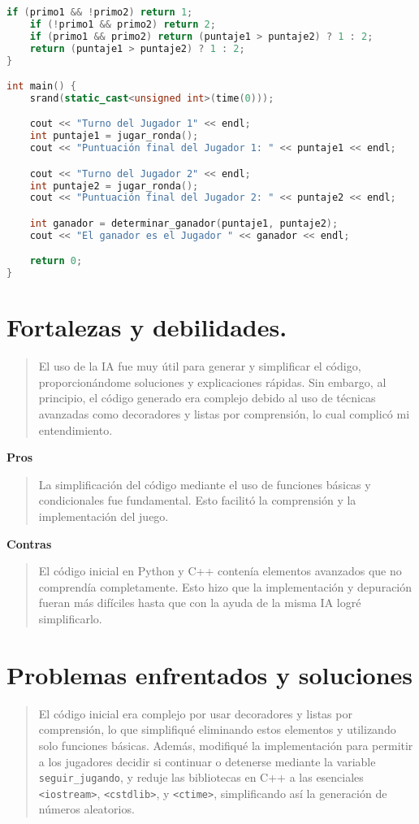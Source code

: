\documentclass{article}
\begin{document}
\begin{lstlisting}[language=C++, Caption=Código en C++]
    if (primo1 && !primo2) return 1;
    if (!primo1 && primo2) return 2;
    if (primo1 && primo2) return (puntaje1 > puntaje2) ? 1 : 2;
    return (puntaje1 > puntaje2) ? 1 : 2;
}

int main() {
    srand(static_cast<unsigned int>(time(0)));

    cout << "Turno del Jugador 1" << endl;
    int puntaje1 = jugar_ronda();
    cout << "Puntuación final del Jugador 1: " << puntaje1 << endl;

    cout << "Turno del Jugador 2" << endl;
    int puntaje2 = jugar_ronda();
    cout << "Puntuación final del Jugador 2: " << puntaje2 << endl;

    int ganador = determinar_ganador(puntaje1, puntaje2);
    cout << "El ganador es el Jugador " << ganador << endl;

    return 0;
}


\end{lstlisting}
\section*{Fortalezas y debilidades.}
\begin{quote}
    El uso de la IA fue muy útil para generar y simplificar el código, proporcionándome soluciones y explicaciones rápidas. Sin embargo, al principio, el código generado era complejo debido al uso de técnicas avanzadas como decoradores y listas por comprensión, lo cual complicó mi entendimiento.
\end{quote}
\textbf{Pros}
\begin{quote}
    La simplificación del código mediante el uso de funciones básicas y condicionales fue fundamental. Esto facilitó la comprensión y la implementación del juego.

\end{quote}
\textbf{Contras}
\begin{quote}
    El código inicial en Python y C++ contenía elementos avanzados que no comprendía completamente. Esto hizo que la implementación y depuración fueran más difíciles hasta que con la ayuda de la misma IA logré simplificarlo.
\end{quote}
\section{Problemas enfrentados y soluciones}
\begin{quote}
    El código inicial era complejo por usar decoradores y listas por comprensión, lo que simplifiqué eliminando estos elementos y utilizando solo funciones básicas. Además, modifiqué la implementación para permitir a los jugadores decidir si continuar o detenerse mediante la variable \verb|seguir_jugando|, y reduje las bibliotecas en C++ a las esenciales \verb|<iostream>|, \verb|<cstdlib>|, y \verb|<ctime>|, simplificando así la generación de números aleatorios.
\end{quote}
\end{document}
